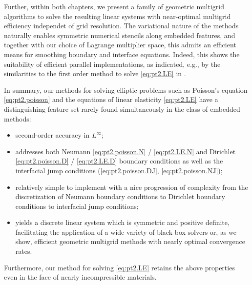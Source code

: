 Further, within both chapters, we present a family of geometric multigrid algorithms to solve the resulting linear systems with near-optimal multigrid efficiency independet of grid resolution. The variational nature of the methods naturally enables symmetric numerical stencils along embedded features, and together with our choice of Lagrange multiplier space, this admits an efficient means for smoothing boundary and interface equations. Indeed, this shows the suitability of efficient parallel implementations, as indicated, e.g., by the similarities to the first order method to solve \eqref{eq:pt2.LE} in \cite{Zhu.Yongning10}.

In summary, our methods for solving elliptic problems such as Poisson's equation \eqref{eq:pt2.poisson} and the equations of linear elasticity \eqref{eq:pt2.LE} have a distinguishing feature set rarely found simultaneously in the class of embedded methods:
\begin{itemize}
\item second-order accuracy in $L^{\infty}$;
\item addresses both Neumann \eqref{eq:pt2.poisson.N} / \eqref{eq:pt2.LE.N} and Dirichlet \eqref{eq:pt2.poisson.D} / \eqref{eq:pt2.LE.D} boundary conditions as well as the interfacial jump conditions (\ref{eq:pt2.poisson.DJ}, \ref{eq:pt2.poisson.NJ});
\item relatively simple to implement with a nice progression of complexity from the discretization of Neumann boundary conditions to Dirichlet boundary conditions to interfacial jump conditions;
\item yields a discrete linear system which is symmetric and positive definite, facilitating the application of a wide variety of black-box solvers or, as we show, efficient geometric multigrid methods with nearly optimal convergence rates.
\end{itemize}
Furthermore, our method for solving \eqref{eq:pt2.LE} retains the above properties even in the face of nearly incompressible materials.
